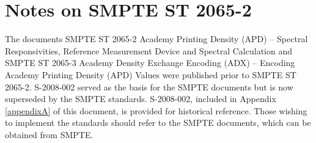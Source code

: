\numberedformat
\chapter{Notes on SMPTE ST 2065-2}

The documents SMPTE ST 2065-2 Academy Printing Density (APD) -- Spectral Responsivities, Reference Measurement Device and Spectral Calculation and SMPTE ST 2065-3 Academy Density Exchange Encoding (ADX) -- Encoding Academy Printing Density (APD) Values were published prior to SMPTE ST 2065-2.  S-2008-002 served as the basis for the SMPTE documents but is now superseded by the SMPTE standards. S-2008-002, included in Appendix \ref{appendixA} of this document, is provided for historical reference. Those wishing to implement the standards should refer to the SMPTE documents, which can be obtained from SMPTE.